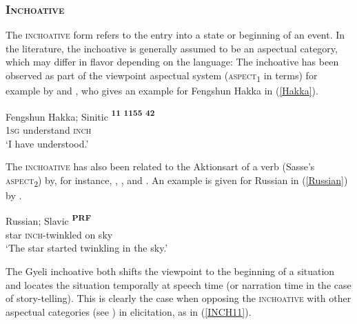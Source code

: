 \subsubsection{\textsc{Inchoative}} 
\label{sec:inch}


The \textsc{inchoative} form refers to the entry into a state or beginning of an event.
In the literature,  the inchoative is generally assumed to be an aspectual category, which may differ in flavor depending on the language:
The inchoative has been observed as part of the viewpoint aspectual system		(\textsc{aspect}\textsubscript{1} in  terms) for example by \citet{melchert80} and \citet[50]{wichaya2013}, who gives an example for Fengshun Hakka in (\ref{Hakka}).


\begin{exe} 
\ex\label{Hakka} Fengshun Hakka; Sinitic
  \gll \textbf{\textsuperscript{11}} \textbf{\textsuperscript{11}}\textbf{\textsuperscript{55}} \textbf{\textsuperscript{42}} \\
      1\textsc{sg} understand \textsc{inch} \\
\trans `I have understood.'
\end{exe}

\noindent The \textsc{inchoative} has also been related to the Aktionsart of a verb (Sasse's \textsc{aspect}\textsubscript{2}) by, for instance, \citet{botne83}, \citet{klein95}, and \citet{talmy2007}. An example is given for Russian in (\ref{Russian}) by \citet[226]{braginsky2008}.

\begin{exe} 
\ex\label{Russian} Russian; Slavic
  \gll \textbf{} \textbf{\textsuperscript{PRF}} \textbf{} \textbf{} \\
      star  \textsc{inch}-twinkled on sky \\
\trans `The star started twinkling in the sky.'
\end{exe}

The Gyeli inchoative both shifts the viewpoint to the beginning of a situation and locates the situation temporally at speech time (or narration time in the case of story-telling). This is clearly the case when opposing the \textsc{inchoative} with other aspectual categories (see ) in elicitation, as in (\ref{INCH11}).

